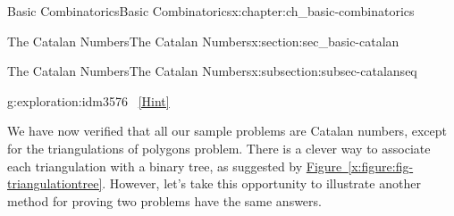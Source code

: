 \documentclass[oneside,10pt,]{book}
\numberwithin{equation}{chapter}
\def\fivegon{%
    \coordinate (a) at (0,2.5);
    \coordinate (b) at (2,1.4);
    \coordinate (c) at (1,0);
    \coordinate (d) at (-.5,0);
    \coordinate (e) at (-2,1.5);
    \draw (a) -- (b) -- (c) -- (d) -- (e) -- (a);
  }
\newcommand{\vtx}[2]{node[fill,circle,inner sep=0pt, minimum size=4pt,label=#1:#2]{}}
\newcommand{\vr}[1]{\vtx{right}{#1}}
\newcommand{\vl}[1]{\vtx{left}{#1}}
\renewcommand{\v}{\vtx{above}{}}
\begin{document}
\begin{chapterptx}{Basic Combinatorics}{}{Basic Combinatorics}{}{}{x:chapter:ch_basic-combinatorics}
\begin{sectionptx}{The Catalan Numbers}{}{The Catalan Numbers}{}{}{x:section:sec_basic-catalan}
\begin{subsectionptx}{The Catalan Numbers}{}{The Catalan Numbers}{}{}{x:subsection:subsec-catalanseq}
\begin{exploration}{}{g:exploration:idm3576}
\qquad~\hfill{\tiny\hyperlink{g:hint:idm3582-back}{[Hint]}}\end{exploration}
We have now verified that all our sample problems are Catalan numbers, except for the triangulations of polygons problem.  There is a clever way to associate each triangulation with a binary tree, as suggested by \hyperref[x:figure:fig-triangulationtree]{Figure~\ref{x:figure:fig-triangulationtree}}.  However, let's take this opportunity to illustrate another method for proving two problems have the same answers.%
\begin{figure}
\centering
\begin{sidebyside}{2}{0.125}{0.125}{0.25}%
\begin{sbspanel}{0.25}%

        \end{sbspanel}%
\begin{sbspanel}{0.25}%


\end{sbspanel}
\end{sidebyside}
\end{figure}
\end{subsectionptx}
\end{sectionptx}
\end{chapterptx}
\end{document}
